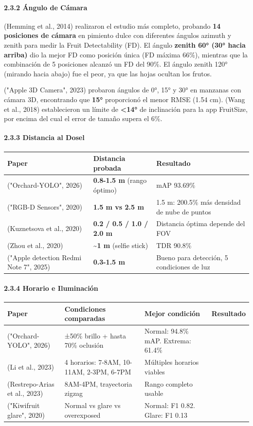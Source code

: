 \paragraph{2.3.2 Ángulo de Cámara}


(Hemming et al., 2014) realizaron el estudio más completo, probando \textbf{14 posiciones de cámara} en pimiento dulce con diferentes ángulos azimuth y zenith para medir la Fruit Detectability (FD). El ángulo \textbf{zenith 60° (30° hacia arriba)} dio la mejor FD como posición única (FD máxima 66\%), mientras que la combinación de 5 posiciones alcanzó un FD del 90\%. El ángulo zenith 120° (mirando hacia abajo) fue el peor, ya que las hojas ocultan los frutos.


("Apple 3D Camera", 2023) probaron ángulos de 0°, 15° y 30° en manzanas con cámara 3D, encontrando que \textbf{15°} proporcionó el menor RMSE (1.54 cm). (Wang et al., 2018) establecieron un límite de \textbf{<14°} de inclinación para la app FruitSize, por encima del cual el error de tamaño supera el 6\%.


\paragraph{2.3.3 Distancia al Dosel}



\begin{tabular}{lll}
\hline
Paper & Distancia probada & Resultado \\
\hline
("Orchard-YOLO", 2026) & \textbf{0.8-1.5 m} (rango óptimo) & mAP 93.69\% \\
("RGB-D Sensors", 2020) & \textbf{1.5 m vs 2.5 m} & 1.5 m: 200.5\% más densidad de nube de puntos \\
(Kuznetsova et al., 2020) & \textbf{0.2 / 0.5 / 1.0 / 2.0 m} & Distancia óptima depende del FOV \\
(Zhou et al., 2020) & \textbf{\textasciitilde{}1 m} (selfie stick) & TDR 90.8\% \\
("Apple detection Redmi Note 7", 2025) & \textbf{0.3-1.5 m} & Bueno para detección, 5 condiciones de luz \\
\hline
\end{tabular}


\paragraph{2.3.4 Horario e Iluminación}



\begin{tabular}{llll}
\hline
Paper & Condiciones comparadas & Mejor condición & Resultado \\
\hline
("Orchard-YOLO", 2026) & ±50\% brillo + hasta 70\% oclusión & Normal: 94.8\% mAP. Extrema: 61.4\% \\
(Li et al., 2023) & 4 horarios: 7-8AM, 10-11AM, 2-3PM, 6-7PM & Múltiples horarios viables \\
(Restrepo-Arias et al., 2023) & 8AM-4PM, trayectoria zigzag & Rango completo usable \\
("Kiwifruit glare", 2020) & Normal vs glare vs overexposed & Normal: F1 0.82. Glare: F1 0.13 \\
\hline
\end{tabular}


